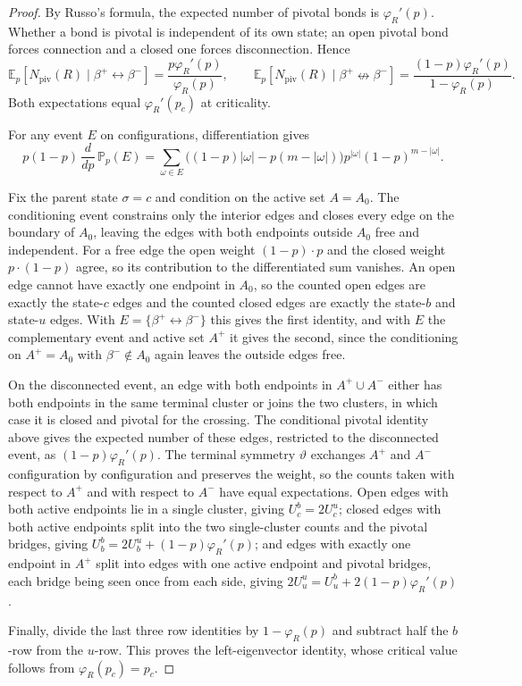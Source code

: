 \begin{proof}
By Russo's formula, the expected number of pivotal bonds is $\varphi_R'(p)$.
Whether a bond is pivotal is independent of its own state; an open pivotal bond forces connection and a closed one forces disconnection. Hence
\[
 \mathbb E_p[N_{\mathrm{piv}}(R)\mid\beta^+\leftrightarrow\beta^-]
 =\frac{p\varphi_R'(p)}{\varphi_R(p)},\qquad
 \mathbb E_p[N_{\mathrm{piv}}(R)\mid\beta^+\nleftrightarrow\beta^-]
 =\frac{(1-p)\varphi_R'(p)}{1-\varphi_R(p)}.
\]
Both expectations equal $\varphi_R'(p_c)$ at criticality.


For any event $E$ on configurations, differentiation gives
\[
   p(1-p)\,\frac{d}{dp}\,\mathbb P_p(E)
   =\sum_{\omega\in E}
   \bigl((1-p)|\omega|-p(m-|\omega|)\bigr)
   p^{|\omega|}(1-p)^{m-|\omega|}.
\]

Fix the parent state $\sigma=c$ and condition on the active set $A=A_0$.
The conditioning event constrains only the interior edges and closes every edge on the boundary of $A_0$, leaving the edges with both endpoints outside $A_0$ free and independent.
For a free edge the open weight $(1-p)\cdot p$ and the closed weight $p\cdot(1-p)$ agree, so its contribution to the differentiated sum vanishes.
An open edge cannot have exactly one endpoint in $A_0$, so the counted open edges are exactly the state-$c$ edges and the counted closed edges are exactly the state-$b$ and state-$u$ edges.
With $E=\{\beta^+\leftrightarrow\beta^-\}$ this gives the first identity, and with $E$ the complementary event and active set $A^{+}$ it gives the second, since the conditioning on $A^{+}=A_0$ with $\beta^-\notin A_0$ again leaves the outside edges free.

On the disconnected event, an edge with both endpoints in $A^{+}\cup A^{-}$ either has both endpoints in the same terminal cluster or joins the two clusters, in which case it is closed and pivotal for the crossing.
The conditional pivotal identity above gives the expected number of these edges, restricted to the disconnected event, as $(1-p)\varphi_R'(p)$.
The terminal symmetry $\vartheta$ exchanges $A^{+}$ and $A^{-}$ configuration by configuration and preserves the weight, so the counts taken with respect to $A^{+}$ and with respect to $A^{-}$ have equal expectations.
Open edges with both active endpoints lie in a single cluster, giving $U^{b}_{c}=2U^{u}_{c}$; closed edges with both active endpoints split into the two single-cluster counts and the pivotal bridges, giving $U^{b}_{b}=2U^{u}_{b}+(1-p)\varphi_R'(p)$; and edges with exactly one endpoint in $A^{+}$ split into edges with one active endpoint and pivotal bridges, each bridge being seen once from each side, giving $2U^{u}_{u}=U^{b}_{u}+2(1-p)\varphi_R'(p)$.

Finally, divide the last three row identities by $1-\varphi_R(p)$ and subtract half the $b$-row from the $u$-row.
This proves the left-eigenvector identity, whose critical value follows from $\varphi_R(p_c)=p_c$.
\end{proof}

